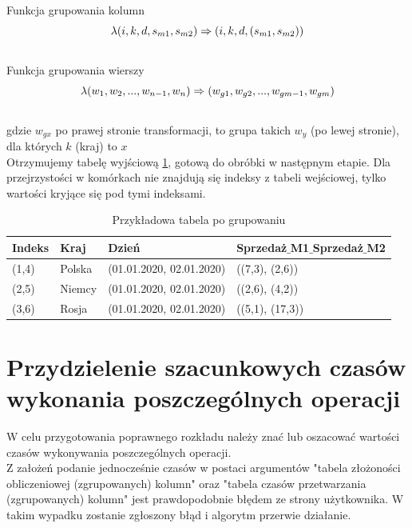 \documentclass[brudnopis]{xmgr}
\begin{document}
Funkcja grupowania kolumn
\begin{equation} \label{eq:example-col-agg}
\lambda (i, k, d, s_{m1}, s_{m2}) \\ \Rightarrow (i, k, d, (s_{m1}, s_{m2}))
\end{equation}
\medskip\\

Funkcja grupowania wierszy
\begin{equation} \label{eq:example-row-agg}
\lambda (w_1, w_2, ..., w_{n-1}, w_n) \\ \Rightarrow (w_{g1}, w_{g2}, ..., w_{gm-1}, w_{gm}) 
\end{equation}
\medskip\\

gdzie $w_{gx}$ po prawej stronie transformacji, to grupa takich $w_y$ (po lewej stronie), dla których $k$ (kraj) to $x$
\medskip\\

Otrzymujemy tabelę wyjściową \ref{tab:example-output}, gotową do obróbki w następnym etapie.
Dla przejrzystości w komórkach nie znajdują się indeksy z tabeli wejściowej, tylko wartości kryjące się pod tymi indeksami.

\begin{table}[!tbh]
\begin{tabular}{|l|l|l|l|} \hline
Indeks & Kraj & Dzień & Sprzedaż$\_$M1$\_$Sprzedaż$\_$M2 \\ \hline
(1,4) & Polska & (01.01.2020, 02.01.2020) & ((7,3), (2,6)) \\ \hline
(2,5) & Niemcy & (01.01.2020, 02.01.2020) & ((2,6), (4,2)) \\ \hline
(3,6) & Rosja & (01.01.2020, 02.01.2020) & ((5,1), (17,3)) \\ \hline
\end{tabular}
\caption{Przykładowa tabela po grupowaniu\label{tab:example-output}}
\end{table}

\newpage

\section{Przydzielenie szacunkowych czasów wykonania poszczególnych operacji}

W celu przygotowania poprawnego rozkładu należy znać lub oszacować wartości czasów wykonywania poszczególnych operacji.
\medskip\\

Z założeń podanie jednocześnie czasów w postaci argumentów "tabela złożoności obliczeniowej (zgrupowanych) kolumn" oraz "tabela czasów przetwarzania (zgrupowanych) kolumn" jest prawdopodobnie błędem ze strony użytkownika. W takim wypadku zostanie zgłoszony błąd i algorytm przerwie działanie.
\medskip\\
\end{document}
